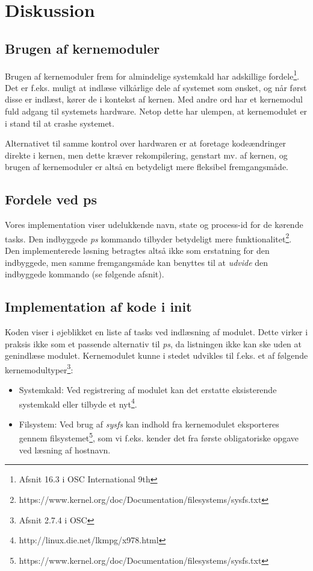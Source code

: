 \chapter{Diskussion}
\section{Brugen af kernemoduler}
Brugen af kernemoduler frem for almindelige systemkald har adskillige fordele\footnote{Afsnit 16.3 i OSC International 9th}. Det er f.eks. muligt at indlæse vilkårlige dele af systemet som ønsket, og når først disse er indlæst, kører de i kontekst af kernen. Med andre ord har et kernemodul fuld adgang til systemets hardware. Netop dette har ulempen, at kernemodulet er i stand til at crashe systemet.

Alternativet til samme kontrol over hardwaren er at foretage kodeændringer direkte i kernen, men dette kræver rekompilering, genstart mv. af kernen, og brugen af kernemoduler er altså en betydeligt mere fleksibel fremgangsmåde.

\section{Fordele ved ps}
Vores implementation viser udelukkende navn, state og process-id for de kørende tasks. Den indbyggede \textit{ps} kommando tilbyder betydeligt mere funktionalitet\footnote{https://www.kernel.org/doc/Documentation/filesystems/sysfs.txt}. Den implementerede løsning betragtes altså ikke som erstatning for den indbyggede, men samme fremgangsmåde kan benyttes til at \textit{udvide} den indbyggede kommando (se følgende afsnit).

\section{Implementation af kode i init}
Koden viser i øjeblikket en liste af tasks ved indlæsning af modulet. Dette virker i praksis ikke som et passende alternativ til \textit{ps}, da listningen ikke kan ske uden at genindlæse modulet. Kernemodulet kunne i stedet udvikles til f.eks. et af følgende kernemodultyper\footnote{Afsnit 2.7.4 i OSC}:
\begin{itemize}
\item Systemkald: Ved registrering af modulet kan det erstatte eksisterende systemkald eller tilbyde et nyt\footnote{http://linux.die.net/lkmpg/x978.html}.
\item Filsystem: Ved brug af \textit{sysfs} kan indhold fra kernemodulet eksporteres gennem filsystemet\footnote{https://www.kernel.org/doc/Documentation/filesystems/sysfs.txt}, som vi f.eks. kender det fra første obligatoriske opgave ved læsning af hostnavn.
\end{itemize}

